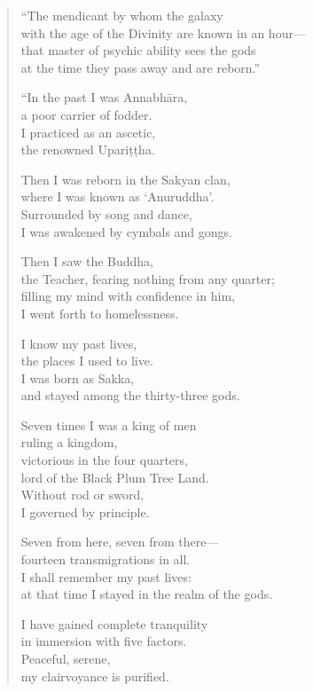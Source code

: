 \documentclass[12pt,openany]{book}%
\begin{document}
\begin{verse}
“The mendicant by whom the galaxy \\
with the age of the Divinity are known in an hour—\\
that master of psychic ability sees the gods \\
at the time they pass away and are reborn.” 

“In the past I was \textsanskrit{Annabhāra}, \\
a poor carrier of fodder. \\
I practiced as an ascetic, \\
the renowned \textsanskrit{Upariṭṭha}. 

Then I was reborn in the Sakyan clan, \\
where I was known as ‘Anuruddha’. \\
Surrounded by song and dance, \\
I was awakened by cymbals and gongs. 

Then I saw the Buddha, \\
the Teacher, fearing nothing from any quarter; \\
filling my mind with confidence in him, \\
I went forth to homelessness. 

I know my past lives, \\
the places I used to live. \\
I was born as Sakka, \\
and stayed among the thirty-three gods. 

Seven times I was a king of men \\
ruling a kingdom, \\
victorious in the four quarters, \\
lord of the Black Plum Tree Land. \\
Without rod or sword, \\
I governed by principle. 

Seven from here, seven from there—\\
fourteen transmigrations in all. \\
I shall remember my past lives: \\
at that time I stayed in the realm of the gods. 

I have gained complete tranquility \\
in immersion with five factors. \\
Peaceful, serene, \\
my clairvoyance is purified. 


\end{verse}
\end{document}
